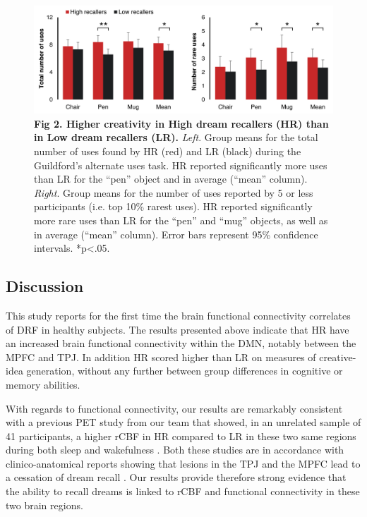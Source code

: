 \begin{figure}[!htbp]
	\includegraphics[width=\textwidth]{Fig/Results/Inertia/Creativity/Fig2.png}
	\caption*{\textbf{Fig 2. Higher creativity in High dream recallers (HR) than in Low dream recallers (LR).} \emph{Left}. Group means for the total number of uses found by HR (red) and LR (black) during the Guildford’s alternate uses task. HR reported significantly more uses than LR for the “pen” object and in average (“mean” column). \emph{Right}. Group means for the number of uses reported by 5 or less participants (i.e. top 10\% rarest uses). HR reported significantly more rare uses than LR for the “pen” and “mug” objects, as well as in average (“mean” column). Error bars represent 95\% confidence intervals. *p<.05.}
\end{figure}


\subsection*{Discussion}
\label{res:dmn-crea:discussion}

This study reports for the first time the brain functional connectivity correlates of DRF in healthy subjects. The results presented above indicate that HR have an increased brain functional connectivity within the DMN, notably between the MPFC and TPJ. In addition HR scored higher than LR on measures of creative-idea generation, without any further between group differences in cognitive or memory abilities.

With regards to functional connectivity, our results are remarkably consistent with a previous PET study from our team that showed, in an unrelated sample of 41 participants, a higher rCBF in HR compared to LR in these two same regions during both sleep and wakefulness \citep{eichenlaub_resting_2014}. Both these studies are in accordance with clinico-anatomical reports showing that lesions in the TPJ and the MPFC lead to a cessation of dream recall \citep{solms_neuropsychology_1997}. Our results provide therefore strong evidence that the ability to recall dreams is linked to rCBF and functional connectivity in these two brain regions.

